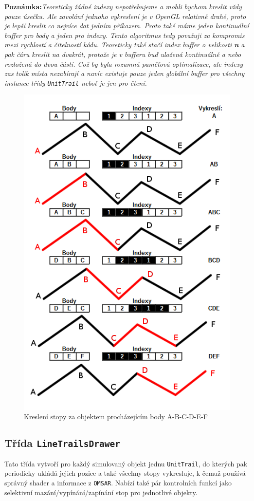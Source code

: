 \textbf{Poznámka:}\textit{Teoreticky žádné indexy nepotřebujeme a mohli bychom kreslit vždy pouze úsečku. Ale zavolání jednoho vykreslení je v OpenGL relativně drahé, proto je lepší kreslit co nejvíce dat jedním příkazem. Proto také máme jeden kontinuální buffer pro body a jeden pro indexy. Tento algoritmus tedy považuji za kompromis mezi rychlostí a čitelností kódu. Teoreticky také stačí index buffer o velikosti \textbf{n} a pak čáru kreslit na dvakrát, protože je v bufferu buď uložená kontinuálně a nebo rozložená do dvou částí. Což by byla rozumná paměťová optimalizace, ale indexy zas tolik místa nezabírají a navíc existuje pouze jeden globální buffer pro všechny instance třídy \texttt{UnitTrail} neboť je jen pro čtení.}
\begin{figure}
	\caption{Kreslení stopy za objektem procházejícím body A-B-C-D-E-F}
	\label{fig:lineTrail} 
	\centering
	\includegraphics[width=0.5\linewidth]{Figs/LineTrail}
\end{figure}
\subsection{Třída \texttt{LineTrailsDrawer}}
Tato třída vytvoří pro každý simulovaný objekt jednu \texttt{UnitTrail}, do kterých pak periodicky ukládá jejich pozice a také všechny stopy vykresluje, k čemuž používá správný shader a informace z \texttt{OMSAR}. Nabízí také pár kontrolních funkcí jako selektivní mazání/vypínání/zapínání stop pro jednotlivé objekty.

